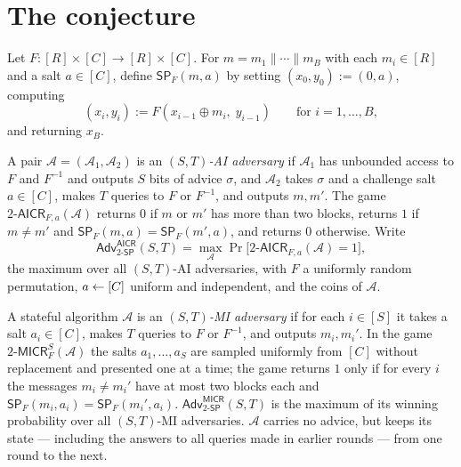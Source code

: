 \documentclass{aicr-conjecture}
\newcommand{\SP}{\mathsf{SP}}
\newcommand{\Adv}{\mathsf{Adv}}
\newcommand{\AICR}{\mathsf{AICR}}
\newcommand{\MICR}{\mathsf{MICR}}
\begin{document}
\section{The conjecture}\label{sec:conjectures}

\begin{definition}\label{def:sponge}
Let $F : [R] \times [C] \to [R] \times [C]$. For
$m = m_{1} \| \cdots \| m_{B}$ with each $m_{i} \in [R]$ and a salt
$a \in [C]$, define $\SP_{F}(m,a)$ by setting
$(x_{0}, y_{0}) := (0, a)$, computing
\[
  (x_{i}, y_{i}) := F(x_{i-1} \oplus m_{i},\; y_{i-1})
  \qquad \text{for } i = 1, \dots, B,
\]
and returning $x_{B}$.
\end{definition}

\begin{definition}\label{def:aicr}
A pair $\mathcal{A} = (\mathcal{A}_{1}, \mathcal{A}_{2})$ is an
\emph{$(S,T)$-AI adversary} if $\mathcal{A}_{1}$ has unbounded access
to $F$ and $F^{-1}$ and outputs $S$ bits of advice $\sigma$, and
$\mathcal{A}_{2}$ takes $\sigma$ and a challenge salt $a \in [C]$,
makes $T$ queries to $F$ or $F^{-1}$, and outputs $m, m'$. The game
$2\text{-}\AICR_{F,a}(\mathcal{A})$ returns $0$ if $m$ or $m'$ has more
than two blocks, returns $1$ if $m \ne m'$ and
$\SP_{F}(m,a) = \SP_{F}(m',a)$, and returns $0$ otherwise. Write
\[
  \Adv^{\AICR}_{2\text{-}\SP}(S,T)
  = \max_{\mathcal{A}}
    \Pr\bigl[2\text{-}\AICR_{F,a}(\mathcal{A}) = 1\bigr],
\]
the maximum over all $(S,T)$-AI adversaries, with $F$ a uniformly
random permutation, $a \leftarrow [C]$ uniform and independent, and the
coins of $\mathcal{A}$.
\end{definition}

\begin{definition}\label{def:micr}
A stateful algorithm $\mathcal{A}$ is an \emph{$(S,T)$-MI adversary} if
for each $i \in [S]$ it takes a salt $a_{i} \in [C]$, makes $T$ queries
to $F$ or $F^{-1}$, and outputs $m_{i}, m_{i}'$. In the game
$2\text{-}\MICR^{S}_{F}(\mathcal{A})$ the salts $a_{1}, \dots, a_{S}$
are sampled uniformly from $[C]$ without replacement and presented one
at a time; the game returns $1$ only if for every $i$ the messages
$m_{i} \ne m_{i}'$ have at most two blocks each and
$\SP_{F}(m_{i}, a_{i}) = \SP_{F}(m_{i}', a_{i})$.
$\Adv^{\MICR}_{2\text{-}\SP}(S,T)$ is the maximum of its winning
probability over all $(S,T)$-MI adversaries. $\mathcal{A}$ carries no
advice, but keeps its state --- including the answers to all queries
made in earlier rounds --- from one round to the next.
\end{definition}
\end{document}
